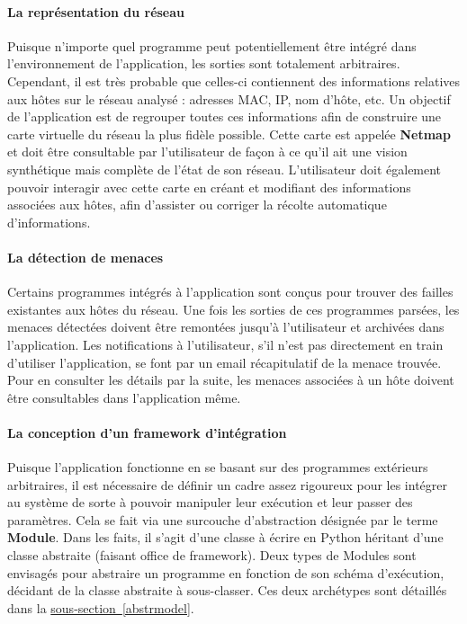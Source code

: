 \documentclass[]{article}
\newcommand{\wordlink}[2]{\hyperref[#1]{#2~\ref{#1}}}
\begin{document}
\newpage

\paragraph{La représentation du réseau}

Puisque n'importe quel programme peut potentiellement être intégré dans l'environnement de l'application, les sorties sont totalement arbitraires. Cependant, il est très probable que celles-ci contiennent des informations relatives aux hôtes sur le réseau analysé : adresses MAC, IP, nom d'hôte, etc. Un objectif de l'application est de regrouper toutes ces informations afin de construire une carte virtuelle du réseau la plus fidèle possible. Cette carte est appelée \textbf{Netmap} et doit être consultable par l'utilisateur de façon à ce qu'il ait une vision synthétique mais complète de l'état de son réseau. L'utilisateur doit également pouvoir interagir avec cette carte en créant et modifiant des informations associées aux hôtes, afin d'assister ou corriger la récolte automatique d'informations.

\paragraph{La détection de menaces}

Certains programmes intégrés à l'application sont conçus pour trouver des failles existantes aux hôtes du réseau. Une fois les sorties de ces programmes parsées, les menaces détectées doivent être remontées jusqu'à l'utilisateur et archivées dans l'application. Les notifications à l'utilisateur, s'il n'est pas directement en train d'utiliser l'application, se font par un email récapitulatif de la menace trouvée. Pour en consulter les détails par la suite, les menaces associées à un hôte doivent être consultables dans l'application même.

\paragraph{La conception d'un framework d'intégration}

Puisque l'application fonctionne en se basant sur des programmes extérieurs arbitraires, il est nécessaire de définir un cadre assez rigoureux pour les intégrer au système de sorte à pouvoir manipuler leur exécution et leur passer des paramètres. Cela se fait via une surcouche d'abstraction désignée par le terme \textbf{Module}. Dans les faits, il s'agit d'une classe à écrire en Python héritant d'une classe abstraite (faisant office de framework). Deux types de Modules sont envisagés pour abstraire un programme en fonction de son schéma d'exécution, décidant de la classe abstraite à sous-classer. Ces deux archétypes sont détaillés dans la \wordlink{abstrmodel}{sous-section}.
\end{document}

